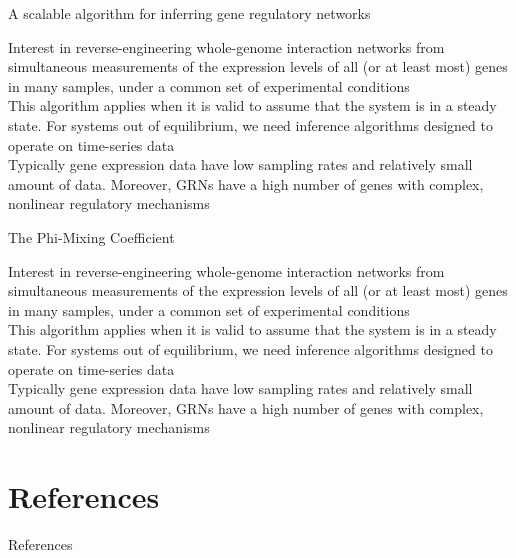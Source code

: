\documentclass[aspectratio=1610]{beamer}					%
\begin{document}
\begin{frame}{A scalable algorithm for inferring gene regulatory networks}

Interest in reverse-engineering whole-genome interaction networks from simultaneous measurements of the
expression levels of all (or at least most) genes in many
samples, under a common set of experimental conditions\\
\vspace{0.2in}
This algorithm applies when it is valid to assume that the system is in a steady state. For systems out of equilibrium, we need inference algorithms designed to operate on time-series data\\
\vspace{0.2in}
Typically gene expression data have low sampling rates and relatively small
amount of data. Moreover, GRNs have a high number of genes
with complex, nonlinear regulatory mechanisms

\end{frame}


\begin{frame}{The Phi-Mixing Coefficient}

Interest in reverse-engineering whole-genome interaction networks from simultaneous measurements of the
expression levels of all (or at least most) genes in many
samples, under a common set of experimental conditions\\
\vspace{0.2in}
This algorithm applies when it is valid to assume that the system is in a steady state. For systems out of equilibrium, we need inference algorithms designed to operate on time-series data\\
\vspace{0.2in}
Typically gene expression data have low sampling rates and relatively small
amount of data. Moreover, GRNs have a high number of genes
with complex, nonlinear regulatory mechanisms

\end{frame}

\section{References}

\begin{frame}[allowframebreaks]{References}
	\tiny
	
\end{frame}
\end{document}
